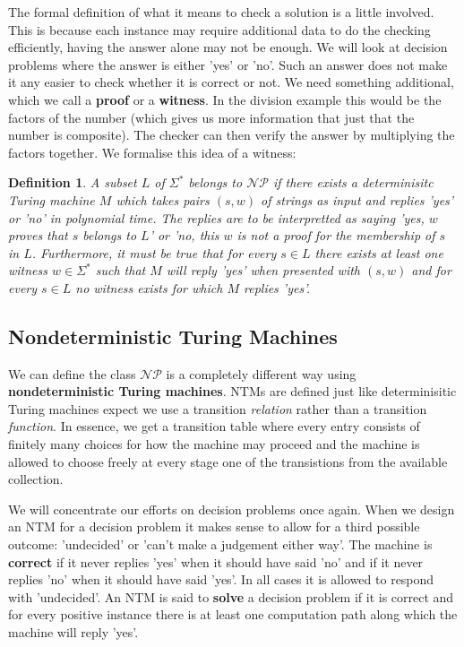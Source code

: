 \documentclass[11pt]{article}
\newtheorem{definition}{Definition}
\begin{document}
	\par 
	The formal definition of what it means to check a solution is a little involved. This is because each instance may require additional data to do the checking efficiently, having the answer alone may not be enough. We will look at decision problems where the answer is either 'yes' or 'no'. Such an answer does not make it any easier to check whether it is correct or not. We need something additional, which we call a \textbf{proof} or a \textbf{witness}. In the division example this would be the factors of the number (which gives us more information that just that the number is composite). The checker can then verify the answer by multiplying the factors together. We formalise this idea of a witness:
	\begin{definition}
		A subset $L$ of $\Sigma^{*}$ belongs to $\mathcal{NP}$ if there exists a determinisitc Turing machine $M$ which takes pairs $(s, w)$ of strings as input and replies 'yes' or 'no' in polynomial time. The replies are to be interpretted as saying 'yes, $w$ proves that $s$ belongs to $L$' or 'no, this $w$ is not a proof for the membership of $s$ in $L$. Furthermore, it must be true that for every $s \in L$ there exists at least one witness $w \in \Sigma^{*}$ such that $M$ will reply 'yes' when presented with $(s, w)$ and for every $s \in L$ no witness exists for which $M$ replies 'yes'.
	\end{definition}
	
	\subsection{Nondeterministic Turing Machines}
	We can define the class $\mathcal{NP}$ is a completely different way using \textbf{nondeterministic Turing machines}. NTMs are defined just like determinisitic Turing machines expect we use a transition \textit{relation} rather than a transition \textit{function}. In essence, we get a transition table where every entry consists of finitely many choices for how the machine may proceed and the machine is allowed to choose freely at every stage one of the transistions from the available collection.
	
	\par 
	We will concentrate our efforts on decision problems once again. When we design an NTM for a decision problem it makes sense to allow for a third possible outcome: 'undecided' or 'can't make a judgement either way'. The machine is \textbf{correct} if it never replies 'yes' when it should have said 'no' and if it never replies 'no' when it should have said 'yes'. In all cases it is allowed to respond with 'undecided'. An NTM is said to \textbf{solve} a decision problem if it is correct and for every positive instance there is at least one computation path along which the machine will reply 'yes'.
	
\end{document}
